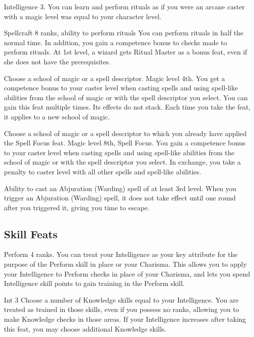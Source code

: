 \featpre Intelligence 3.
\featben You can learn and perform rituals as if you were an arcane caster with a magic level was equal to your character level.

 Spellcraft 8 ranks, ability to perform rituals
 You can perform rituals in half the normal time. In addition, you gain a  competence bonus to checks made to perform rituals.
 At 1st level, a wizard gets Ritual Master as a bonus feat, even if she does not have the prerequisites.

Choose a school of magic or a spell descriptor.
 Magic level 4th.
 You get a  competence bonus to your caster level when casting spells and using spell-like abilities from the school of magic or with the spell descriptor you select.
 You can gain this feat multiple times. Its effects do not stack. Each time you take the feat, it applies to a new school of magic.

Choose a school of magic or a spell descriptor to which you already have applied the Spell Focus feat.
\featpre Magic level 8th, Spell Focus.
\featben You gain a  competence bonus to your caster level when casting spells and using spell-like abilities from the school of magic or with the spell descriptor you select. In exchange, you take a  penalty to caster level with all other spells and spell-like abilities.

\featpre Ability to cast an Abjuration (Warding) spell of at least 3rd level.
\featben When you trigger an Abjuration (Warding) spell, it does not take effect until one round after you triggered it, giving you time to escape.

\subsection{Skill Feats}

\featpre Perform 4 ranks.
\featben You can treat your Intelligence as your key attribute for the purpose of the Perform skill in place or your Charisma. This allows you to apply your Intelligence to Perform checks in place of your Charisma, and lets you spend Intelligence skill points to gain training in the Perform skill.

 Int 3
 Choose a number of Knowledge skills equal to your Intelligence. You are treated as trained in those skills, even if you possess no ranks, allowing you to make Knowledge checks in those areas. If your Intelligence increases after taking this feat, you may choose additional Knowledge skills.

